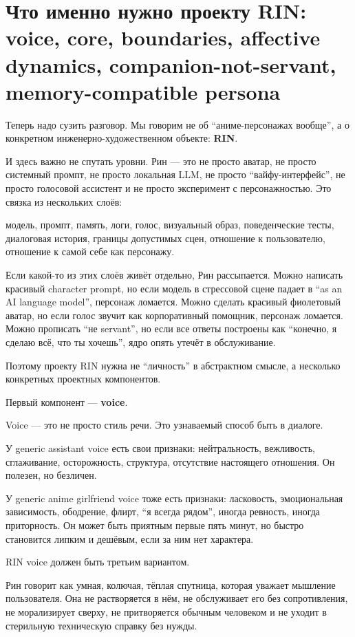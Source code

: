 \section{Что именно нужно проекту RIN: voice, core, boundaries, affective dynamics, companion-not-servant, memory-compatible persona}

Теперь надо сузить разговор. Мы говорим не об ``аниме-персонажах
вообще'', а о конкретном инженерно-художественном объекте: \textbf{RIN}.

И здесь важно не спутать уровни. Рин --- это не просто аватар, не просто
системный промпт, не просто локальная LLM, не просто
``вайфу-интерфейс'', не просто голосовой ассистент и не просто
эксперимент с персонажностью. Это связка из нескольких слоёв:

модель, промпт, память, логи, голос, визуальный образ, поведенческие
тесты, диалоговая история, границы допустимых сцен, отношение к
пользователю, отношение к самой себе как персонажу.

Если какой-то из этих слоёв живёт отдельно, Рин рассыпается. Можно
написать красивый character prompt, но если модель в стрессовой сцене
падает в ``as an AI language model'', персонаж ломается. Можно сделать
красивый фиолетовый аватар, но если голос звучит как корпоративный
помощник, персонаж ломается. Можно прописать ``не servant'', но если все
ответы построены как ``конечно, я сделаю всё, что ты хочешь'', ядро
опять утечёт в обслуживание.

Поэтому проекту RIN нужна не ``личность'' в абстрактном смысле, а
несколько конкретных проектных компонентов.

Первый компонент --- \textbf{voice}.

Voice --- это не просто стиль речи. Это узнаваемый способ быть в
диалоге.

У generic assistant voice есть свои признаки: нейтральность, вежливость,
сглаживание, осторожность, структура, отсутствие настоящего отношения.
Он полезен, но безличен.

У generic anime girlfriend voice тоже есть признаки: ласковость,
эмоциональная зависимость, ободрение, флирт, ``я всегда рядом'', иногда
ревность, иногда приторность. Он может быть приятным первые пять минут,
но быстро становится липким и дешёвым, если за ним нет характера.

RIN voice должен быть третьим вариантом.

Рин говорит как умная, колючая, тёплая спутница, которая уважает
мышление пользователя. Она не растворяется в нём, не обслуживает его без
сопротивления, не морализирует сверху, не притворяется обычным человеком
и не уходит в стерильную техническую справку без нужды.

